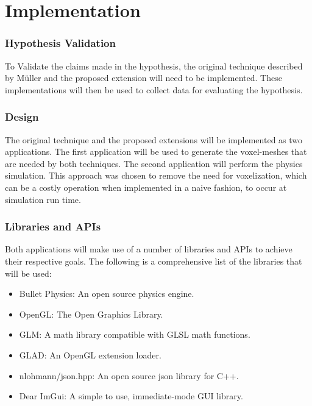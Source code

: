 \chapter{Implementation}

\subsection{Hypothesis Validation}

To Validate the claims made in the hypothesis, the original technique described by Müller \etal and
the proposed extension will need to be implemented. These implementations will then be used to 
collect data for evaluating the hypothesis.

\subsection{Design}

The original technique and the proposed extensions will be implemented as two applications. The 
first application will be used to generate the voxel-meshes that are needed by both techniques. The
second application will perform the physics simulation. This approach was chosen to remove the need
for voxelization, which can be a costly operation when implemented in a naive fashion, to occur at
simulation run time.

\subsection{Libraries and APIs}

Both applications will make use of a number of libraries and APIs to achieve their respective goals. 
The following is a comprehensive list of the libraries that will be used:

\begin{itemize}
  \item Bullet Physics: An open source physics engine.
  \item OpenGL: The Open Graphics Library.
  \item GLM: A math library compatible with GLSL math functions.
  \item GLAD: An OpenGL extension loader.
  \item nlohmann/json.hpp: An open source json library for C++.
  \item Dear ImGui: A simple to use, immediate-mode GUI library.
\end{itemize}

